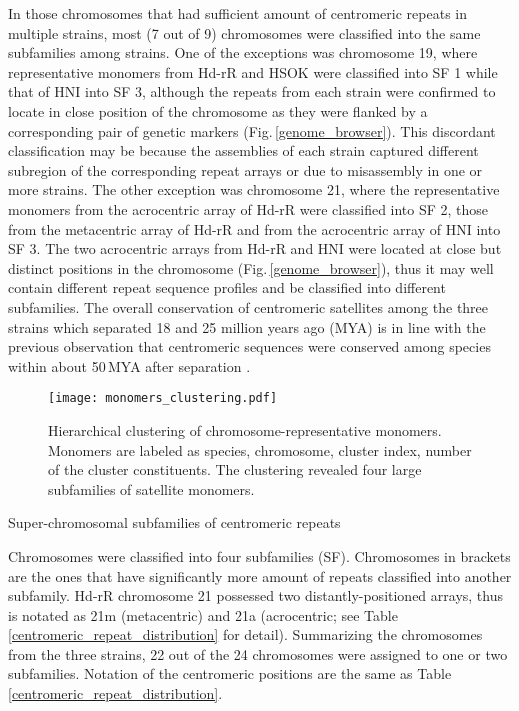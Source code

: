   In those chromosomes that had sufficient amount of centromeric repeats in multiple strains, most (7 out of 9) chromosomes were classified into the same subfamilies among strains. One of the exceptions was chromosome 19, where representative monomers from Hd-rR and HSOK were classified into SF 1 while that of HNI into SF 3, although the repeats from each strain were confirmed to locate in close position of the chromosome as they were flanked by a corresponding pair of genetic markers (Fig.\,\ref{genome_browser}). This discordant classification may be because the assemblies of each strain captured different subregion of the corresponding repeat arrays or due to misassembly in one or more strains. The other exception was chromosome 21, where the representative monomers from the acrocentric array of Hd-rR were classified into SF 2, those from the metacentric array of Hd-rR and from the acrocentric array of HNI into SF 3. The two acrocentric arrays from Hd-rR and HNI were located at close but distinct positions in the chromosome (Fig.\,\ref{genome_browser}), thus it may well contain different repeat sequence profiles and be classified into different subfamilies. The overall conservation of centromeric satellites among the three strains which separated 18 and 25 million years ago (MYA) is in line with the previous observation that centromeric sequences were conserved among species within about 50\,MYA after separation \cite{Melters2013}.

  \begin{figure*}
    \centering
    \texttt{[image: monomers\_clustering.pdf]}
    \caption{
      Hierarchical clustering of chromosome-representative monomers. Monomers are labeled as species, chromosome, cluster index, number of the cluster constituents. The clustering revealed four large subfamilies of satellite monomers.
    }
    \label{monomer_clustering}
  \end{figure*}

  \begin{table*}
    \centering
    \caption{Super-chromosomal subfamilies of centromeric repeats}
    
    \label{super_chromosomal_subfamily}
    \caption*{{\small
      Chromosomes were classified into four subfamilies (SF). Chromosomes in brackets are the ones that have significantly more amount of repeats classified into another subfamily. Hd-rR chromosome 21 possessed two distantly-positioned arrays, thus is notated as 21m (metacentric) and 21a (acrocentric; see Table \ref{centromeric_repeat_distribution} for detail). Summarizing the chromosomes from the three strains, 22 out of the 24 chromosomes were assigned to one or two subfamilies. Notation of the centromeric positions are the same as Table \ref{centromeric_repeat_distribution}.
    }}
  \end{table*}


